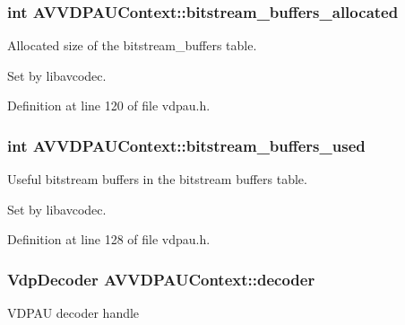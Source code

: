 \subsubsection[{\texorpdfstring{bitstream\+\_\+buffers\+\_\+allocated}{bitstream_buffers_allocated}}]{ {\bf int} A\+V\+V\+D\+P\+A\+U\+Context\+::bitstream\+\_\+buffers\+\_\+allocated}\hypertarget{struct_a_v_v_d_p_a_u_context_a4dcbc0fe3aa59529a032d63777e00b4a}{}\label{struct_a_v_v_d_p_a_u_context_a4dcbc0fe3aa59529a032d63777e00b4a}
Allocated size of the bitstream\+\_\+buffers table.

Set by libavcodec. 

Definition at line 120 of file vdpau.\+h.

\subsubsection[{\texorpdfstring{bitstream\+\_\+buffers\+\_\+used}{bitstream_buffers_used}}]{ {\bf int} A\+V\+V\+D\+P\+A\+U\+Context\+::bitstream\+\_\+buffers\+\_\+used}\hypertarget{struct_a_v_v_d_p_a_u_context_a9116d89dbc37270ff70579b1e9411069}{}\label{struct_a_v_v_d_p_a_u_context_a9116d89dbc37270ff70579b1e9411069}
Useful bitstream buffers in the bitstream buffers table.

Set by libavcodec. 

Definition at line 128 of file vdpau.\+h.

\subsubsection[{\texorpdfstring{decoder}{decoder}}]{\setlength{\rightskip}{0pt plus 5cm}Vdp\+Decoder A\+V\+V\+D\+P\+A\+U\+Context\+::decoder}\hypertarget{struct_a_v_v_d_p_a_u_context_a54b51de52e8b936c93272cad8e94e395}{}\label{struct_a_v_v_d_p_a_u_context_a54b51de52e8b936c93272cad8e94e395}
V\+D\+P\+AU decoder handle

